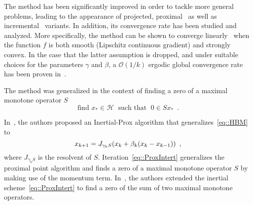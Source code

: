 \documentclass[envcountsect]{svjour3}
\newcommand{\ie}{{\it i.e.}}
\newcommand{\Hil}{{\mathcal{H} }}
\begin{document}
The method has been significantly improved in order to tackle more general problems, leading to the appearance of projected, proximal~\cite{ipiasco} as well as incremental~\cite{gurbuzbalaban2015convergence} variants. In addition, its convergence rate has been studied and analyzed. More specifically, the method can be shown to converge linearly~\cite{PolyakBook} when the function $f$ is both smooth (Lipschitz continuous gradient) and strongly convex. In the case that the latter assumption is dropped, and under suitable choices for the parameters $\gamma$ and $\beta$, a $\mathcal{O}(1/k)$ ergodic global convergence rate has been proven in~\cite{ghadimi2015global}.

The method was generalized in the context of finding a zero of a maximal monotone operator $S$
\begin{equation*}
 \mbox{find } x_\ast\in\Hil \; \mbox{ such that }\; 0\in S x_\ast\enspace.
\end{equation*}

In~\cite{AlvarezAttouch2001}, the authors proposed an Inertial-Prox algorithm that generalizes~\eqref{eq::HBM} to
\begin{equation}{\label{eq::ProxIntert}}
 x_{k+1} = J_{\gamma_k S}(x_k + \beta_k(x_k-x_{k-1}))\enspace,
\end{equation}
where $J_{\gamma_k S}$ is the resolvent of $S$. Iteration~\eqref{eq::ProxIntert} generalizes the proximal point algorithm and finds a zero of a maximal monotone operator $S$ by making use of the momentum term. In~\cite{Moudafi2003447}, the authors extended the inertial scheme~\eqref{eq::ProxIntert} to find a zero of the sum of two maximal monotone operators.

\end{document}
